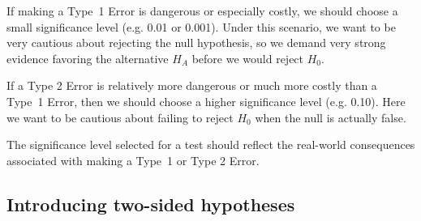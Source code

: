 If making a Type~1 Error is dangerous or especially costly, we should choose a small significance level (e.g. 0.01 or 0.001). Under this scenario, we want to be very cautious about rejecting the null hypothesis, so we demand very strong evidence favoring the alternative $H_A$ before we would reject $H_0$.

If a Type 2 Error is relatively more dangerous or much more costly than a Type~1 Error, then we should choose a higher significance level (e.g. 0.10). Here we want to be cautious about failing to reject $H_0$ when the null is actually false.

\begin{tipBox}{
The significance level selected for a test should reflect the real-world consequences associated with making a Type~1 or Type 2 Error.}
\end{tipBox}


\subsection{Introducing two-sided hypotheses}
\label{IntroducingTwoSidedHypotheses}


